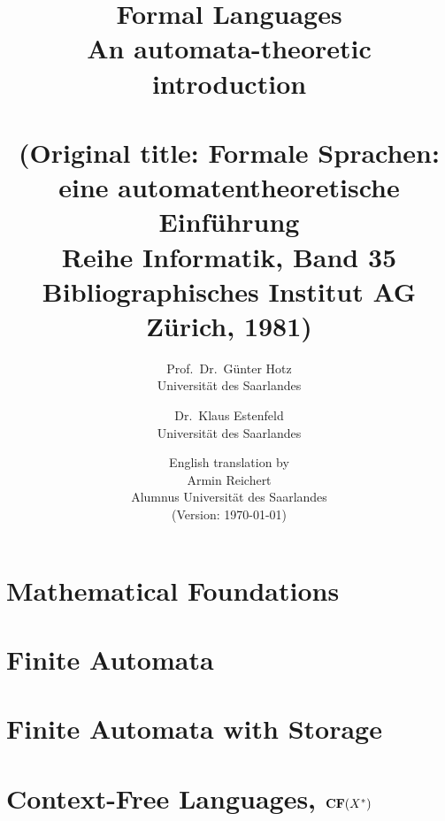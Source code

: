 \documentclass[a4paper]{amsbook}
\title{Formal Languages\\An automata-theoretic introduction\\
\ \\
(Original title: Formale Sprachen: eine automatentheoretische Einführung\\
Reihe Informatik, Band 35\\
Bibliographisches Institut AG Zürich, 1981)}
\author{Prof.\ Dr.\ Günter Hotz\\Universität des Saarlandes
\and Dr.\ Klaus Estenfeld\\Universität des Saarlandes
\and English translation by\\Armin Reichert\\Alumnus Universität des
Saarlandes\\(Version: \today)}
\begin{document}
\maketitle
\tableofcontents


\chapter{Mathematical Foundations}
	
	
	
	
	
	
\chapter{Finite Automata}
	
	
	
	
	
	
	
	
\chapter{Finite Automata with Storage}
	
	
	
	
	
\chapter{Context-Free Languages, $\mbox{{\bf CF}}(X^*)$}
	
	


\nocite{*}

\end{document}
